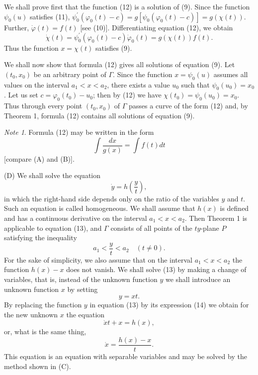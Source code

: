 \documentclass[10pt,a5paper]{book}
\theoremstyle{plain}
\theoremstyle{definition}
\theoremstyle{remark}
\newtheorem*{note}{Note}
\begin{document}
We shall prove first that the function (12) is a solution of (9). Since the function $\psi_{0}(u)$ satisfies (11), $\psi_{0}^{\prime}\left(\varphi_{0}(t)-c\right)=g\left[\psi_{0}\left(\varphi_{0}(t)-c\right)\right]=g(\chi(t))$. Further, $\dot{\varphi}(t)=f(t)$ [see (10)]. Differentiating equation (12), we obtain
\[
\dot{\chi}(t)=\psi_{0}^{\prime}\left(\varphi_{0}(t)-c\right) \dot{\varphi}_{0}(t)=g(\chi(t)) f(t) .
\]
Thus the function $x=\chi(t)$ satisfies (9).

We shall now show that formula (12) gives all solutions of equation (9). Let $\left(t_{0}, x_{0}\right)$ be an arbitrary point of $\Gamma$. Since the function $x=\psi_{0}(u)$ assumes all values on the interval $a_{1}<x<a_{2}$, there exists a value $u_{0}$ such that $\psi_{0}\left(u_{0}\right)=x_{0}$. Let us set $c=\varphi_{0}\left(t_{0}\right)-u_{0}$; then by (12) we have $\chi\left(t_{0}\right)=\psi_{0}\left(u_{0}\right)=x_{0}$. Thus through every point $\left(t_{0}, x_{0}\right)$ of $\Gamma$ passes a curve of the form (12) and, by Theorem 1, formula (12) contains all solutions of equation (9).

\begin{note}
Formula (12) may be written in the form
\[
\int \frac{d x}{g(x)}=\int f(t) d t
\]
[compare (A) and (B)].
\end{note}
(D) We shall solve the equation
\begin{equation*}
\dot{y}=h\left(\frac{y}{t}\right), \tag{13}
\end{equation*}
in which the right-hand side depends only on the ratio of the variables $y$ and $t$. Such an equation is called homogeneous. We shall assume that $h(x)$ is defined and has a continuous derivative on the interval $a_{1}<x<a_{2}$. Then Theorem 1 is applicable to equation (13), and $\Gamma$ consists of all points of the $t y$-plane $P$ satisfying the inequality
\[
a_{1}<\frac{y}{t}<a_{2} \quad(t \neq 0) .
\]
For the sake of simplicity, we also assume that on the interval $a_{1}<x<a_{2}$ the function $h(x)-x$ does not vanish. We shall solve (13) by making a change of variables, that is, instead of the unknown function $y$ we shall
introduce an unknown function $x$ by setting
\begin{equation*}
y=x t . \tag{14}
\end{equation*}
By replacing the function $y$ in equation (13) by its expression (14) we obtain for the new unknown $x$ the equation
\[
\dot{x} t+x=h(x),
\]
or, what is the same thing,
\[
\dot{x}=\frac{h(x)-x}{t} .
\]
This equation is an equation with separable variables and may be solved by the method shown in (C).
\end{document}
